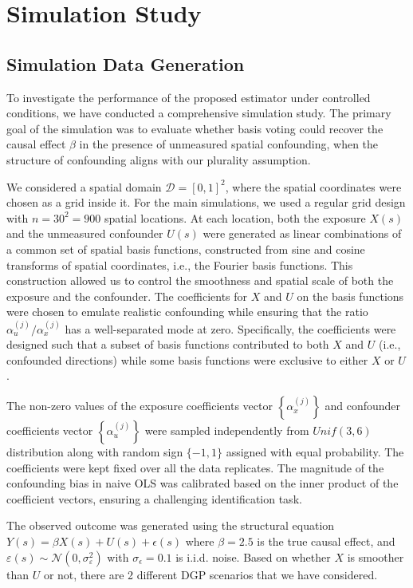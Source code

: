 \documentclass[
  12pt]{article}
\begin{document}
\section{Simulation Study}\label{sec:simulation}
\subsection{Simulation Data Generation}\label{sec:sim-data}
To investigate the performance of the proposed estimator under controlled conditions, we have conducted a comprehensive simulation study. The primary goal of the simulation was to evaluate whether basis voting could recover the causal effect $\beta$ in the presence of unmeasured spatial confounding, when the structure of confounding aligns with our plurality assumption.

We considered a spatial domain $\mathcal{D} = [0,1]^2$, where the spatial coordinates were chosen as a grid inside it. For the main simulations, we used a regular grid design with $n = 30^2 = 900$ spatial locations. At each location, both the exposure $X(s)$ and the unmeasured confounder $U(s)$ were generated as linear combinations of a common set of spatial basis functions, constructed from sine and cosine transforms of spatial coordinates, i.e., the Fourier basis functions. This construction allowed us to control the smoothness and spatial scale of both the exposure and the confounder. The coefficients for $X$ and $U$ on the basis functions were chosen to emulate realistic confounding while ensuring that the ratio $\alpha_u^{(j)} / \alpha_x^{(j)}$ has a well-separated mode at zero. Specifically, the coefficients were designed such that a subset of basis functions contributed to both $X$ and $U$ (i.e., confounded directions) while some basis functions were exclusive to either $X$ or $U$.

The non-zero values of the exposure coefficients vector $\left\{\alpha_x^{(j)}\right\}$ and confounder coefficients vector $\left\{\alpha_u^{(j)}\right\}$ were sampled independently from $Unif(3,6)$ distribution along with random sign $\{-1,1\}$ assigned with equal probability. The coefficients were kept fixed over all the data replicates. 
The magnitude of the confounding bias in naive OLS was calibrated based on the inner product of the coefficient vectors, ensuring a challenging identification task. 

The observed outcome was generated using the structural equation 
$Y(s) = \beta X(s) + U(s) + \epsilon(s)$
where $\beta = 2.5$ is the true causal effect, and $\varepsilon(s) \sim \mathcal{N}(0, \sigma^2_\varepsilon)$ with $\sigma_\epsilon = 0.1$ is i.i.d. noise. Based on whether $X$ is smoother than $U$ or not, there are 2 different DGP scenarios that we have considered. 
\end{document}
